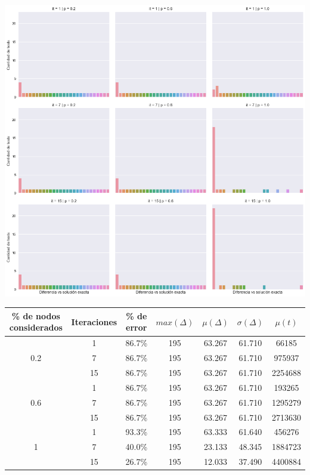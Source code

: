 \begin{center}
    \includegraphics[scale=0.6]{img/path-grasp2-3x3.png}
    
    \begin{tabular}{ | c | c | c | c | c | c | c |}
        \hline
        \% de nodos considerados & Iteraciones & \% de error & $max(\Delta)$ & $\mu(\Delta)$ & $\sigma(\Delta)$ & $\mu(t)$ \\ \hline
            & 1  & 86.7\% & 195 & 63.267 & 61.710 &   66185 \\ \cline{2-7}
        0.2 & 7  & 86.7\% & 195 & 63.267 & 61.710 &  975937 \\ \cline{2-7}
            & 15 & 86.7\% & 195 & 63.267 & 61.710 & 2254688 \\ \hline
            & 1  & 86.7\% & 195 & 63.267 & 61.710 &  193265 \\ \cline{2-7}
        0.6 & 7  & 86.7\% & 195 & 63.267 & 61.710 & 1295279 \\ \cline{2-7}
            & 15 & 86.7\% & 195 & 63.267 & 61.710 & 2713630 \\ \hline
            & 1  & 93.3\% & 195 & 63.333 & 61.640 &  456276 \\ \cline{2-7}
        1   & 7  & 40.0\% & 195 & 23.133 & 48.345 & 1884723 \\ \cline{2-7}
            & 15 & 26.7\% & 195 & 12.033 & 37.490 & 4400884 \\
        \hline
    \end{tabular}
\end{center}

